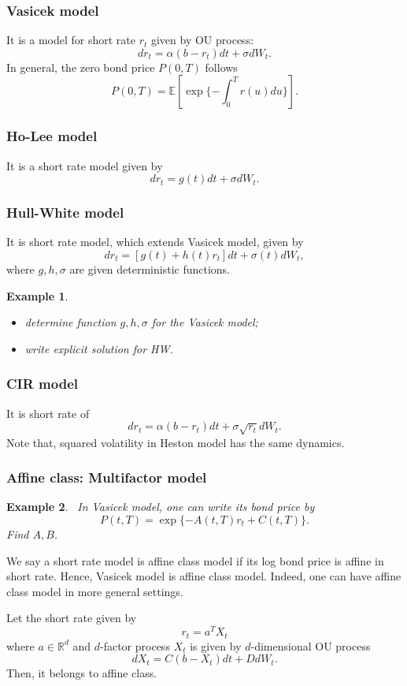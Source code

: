 \documentclass{article}
\newtheorem{example}{Example}
\begin{document}
\subsubsection{Vasicek model}
It is a model for short rate $r_t$ given by OU process:
$$d r_t = \alpha(b - r_t) dt + \sigma dW_t.$$
In general, the zero bond price $P(0, T)$ follows
$$P(0, T) = \mathbb E[ \exp\{- \int_0^T r(u) du\} ].$$

\subsubsection{Ho-Lee model}
It is a short rate model given by
$$d r_t = g(t) dt + \sigma dW_t.$$

\subsubsection{Hull-White model}
It is short rate model, which extends Vasicek model, given by
$$dr_t = [g(t) + h(t) r_t] dt + \sigma(t) dW_t,$$
where $g, h, \sigma$ are given deterministic functions.

\begin{example}
\label{exm:hw01}\begin{itemize}
\item determine function $g, h, \sigma$ for the Vasicek model;
\item write explicit solution for HW.
\end{itemize}
\end{example}


\subsubsection{CIR model}
It is short rate of
$$d r_t = \alpha(b - r_t) dt + \sigma \sqrt{r_t} dW_t.$$
Note that, squared volatility in Heston model has the same dynamics.

\subsubsection{Affine class: Multifactor model}


\begin{example}
\label{exm:mf01}\
In Vasicek model, one can write its bond price by
$$P(t, T) = \exp\{-A(t, T) r_t+ C(t, T)\}.$$
Find $A, B$.
\end{example}
We say a short rate model is affine class model if its log bond price is affine in short rate. Hence, Vasicek model is affine class model.
Indeed, one can have affine class model in more general settings.

Let the short rate given by 
$$r_t = a^T X_t$$
where $a\in \mathbb R^d$ and $d$-factor process $X_t$ is given by $d$-dimensional OU process
$$d X_t = C(b- X_t) dt + D dW_t.$$
Then, it belongs to affine class.





%
%

\end{document}
